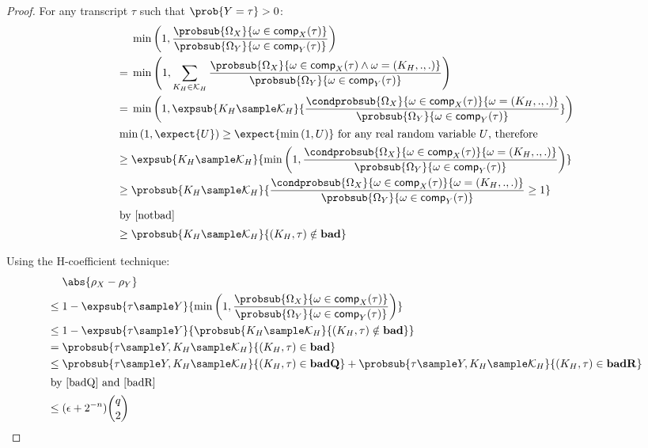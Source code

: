\documentclass[eprint.tex]{subfiles}
\begin{document}
\begin{proof}
    For any transcript $\tau$ such that $\prob{Y = \tau} > 0$:
    \begin{align*}
        {}& \minone{
               \frac{\probsub{\Omega_X}{\omega \in \comp_X(\tau)}}
               {\probsub{\Omega_Y}{\omega \in \comp_Y(\tau)}}
            } \\
        ={}& \minone{
            \sum_{K_H \in \mathcal{K}_H}
              \frac{\probsub{\Omega_X}{\omega \in \comp_X(\tau) \wedge \omega = (K_H, ., .)}}
              {\probsub{\Omega_Y}{\omega \in \comp_Y(\tau)}}
            } \\
        ={}& \minone{
            \expsub{K_H \sample \mathcal{K}_H}{
              \frac{\condprobsub{\Omega_X}{\omega \in \comp_X(\tau)}{\omega = (K_H, ., .)}}
              {\probsub{\Omega_Y}{\omega \in \comp_Y(\tau)}}}
            } \\
        \intertext{$\minone{\expect{U}} \geq \expect{\minone{U}}$ for any real random variable $U$, therefore}
        \geq{}&
            \expsub{K_H \sample \mathcal{K}_H}{
              \minone{
              \frac{\condprobsub{\Omega_X}{\omega \in \comp_X(\tau)}{\omega = (K_H, ., .)}}
              {\probsub{\Omega_Y}{\omega \in \comp_Y(\tau)}}
              }} \\
        \geq{}&
            \probsub{K_H \sample \mathcal{K}_H}{
                \frac{\condprobsub{\Omega_X}{\omega \in \comp_X(\tau)}{\omega = (K_H, ., .)}}
                {\probsub{\Omega_Y}{\omega \in \comp_Y(\tau)}} \geq 1
            } \\
        \intertext{by \autoref{notbad}}
        \geq{}& \probsub{K_H \sample \mathcal{K}_H}{(K_H, \tau) \notin \bad} \\
    \end{align*}

    Using the H-coefficient technique:
    \begin{align*}
        {}&\abs{\rho_X - \rho_Y} \\
        \leq{}& 1 - \expsub{\tau \sample Y}{\minone{
               \frac{\probsub{\Omega_X}{\omega \in \comp_X(\tau)}}
               {\probsub{\Omega_Y}{\omega \in \comp_Y(\tau)}}
            }} \\
        \leq{}& 1 - \expsub{\tau \sample Y}{
            \probsub{K_H \sample \mathcal{K}_H}{(K_H, \tau) \notin \bad}} \\
        = {}& \probsub{\tau \sample Y, K_H \sample \mathcal{K}_H}{(K_H, \tau) \in \bad} \\
        \leq {}& \probsub{\tau \sample Y, K_H \sample \mathcal{K}_H}{(K_H, \tau) \in \badQ}
         + \probsub{\tau \sample Y, K_H \sample \mathcal{K}_H}{(K_H, \tau) \in \badR} \\
         \intertext{by \autoref{badQ} and \autoref{badR}}
        \leq {}& (\epsilon + 2^{-n})\binom{q}{2} \qedhere \\
    \end{align*}
\end{proof}
\end{document}
